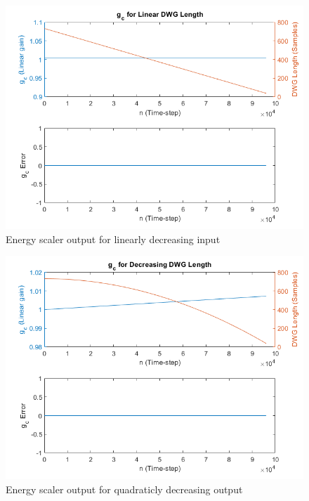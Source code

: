 \documentclass[../main.tex]{subfiles}
\begin{document}
\begin{figure}[h!]
    \centering
    \includegraphics[scale=.63]{./images/plots/EnergyScalerLinearDecreasing.png}
    \caption{Energy scaler output for linearly decreasing input}
    \label{fig:EnergyScalerLinDec}
\end{figure}

\begin{figure}[h!]
    \centering
    \includegraphics[scale=.63]{./images/plots/EnergyScalerQuadraticDecreasing.png}
    \caption{Energy scaler output for quadraticly decreasing output}
    \label{fig:EnergyScalerQuadDec}
\end{figure}

\clearpage
\end{document}
